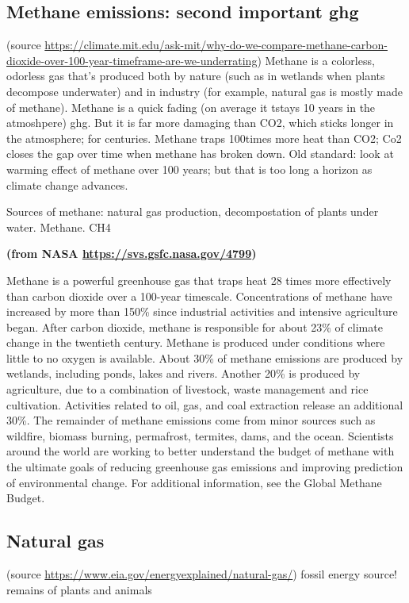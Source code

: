 \subsection{Methane emissions: second important ghg}
(source \url{https://climate.mit.edu/ask-mit/why-do-we-compare-methane-carbon-dioxide-over-100-year-timeframe-are-we-underrating})
Methane is a colorless, odorless gas that’s produced both by nature (such as in wetlands when plants decompose underwater) and in industry (for example, natural gas is mostly made of methane). 
Methane is a quick fading (on average it tstays 10 years in the atmoshpere) ghg. But it is far more damaging than CO2, which sticks longer in the atmosphere; for centuries. 
Methane traps 100times more heat than CO2; Co2 closes the gap over time when  methane has broken down. Old standard: look at warming effect of methane over 100 years; but that is too long a horizon as climate change advances. 

Sources of methane: natural gas production, decompostation of plants under water. 
Methane. CH4

\textbf{(from NASA \url{https://svs.gsfc.nasa.gov/4799})}

Methane is a powerful greenhouse gas that traps heat 28 times more effectively than carbon dioxide over a 100-year timescale. Concentrations of methane have increased by more than 150\% since industrial activities and intensive agriculture began. After carbon dioxide, methane is responsible for about 23\% of climate change in the twentieth century. Methane is produced under conditions where little to no oxygen is available. About 30\% of methane emissions are produced by wetlands, including ponds, lakes and rivers. Another 20\% is produced by agriculture, due to a combination of livestock, waste management and rice cultivation. Activities related to oil, gas, and coal extraction release an additional 30\%. The remainder of methane emissions come from minor sources such as wildfire, biomass burning, permafrost, termites, dams, and the ocean. Scientists around the world are working to better understand the budget of methane with the ultimate goals of reducing greenhouse gas emissions and improving prediction of environmental change. For additional information, see the Global Methane Budget.
\subsection{Natural gas}
(source \url{https://www.eia.gov/energyexplained/natural-gas/})
fossil energy source! remains of plants and animals

